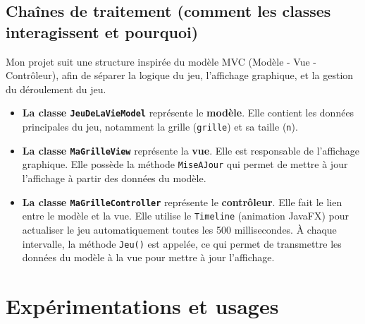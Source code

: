 \documentclass[a4paper,12pt]{article}
\begin{document}
    \subsection{Chaînes de traitement (comment les classes interagissent et pourquoi)}

Mon projet suit une structure inspirée du modèle MVC (Modèle - Vue - Contrôleur), afin de séparer la logique du jeu, l'affichage graphique, et la gestion du déroulement du jeu.

\begin{itemize}
    \item \textbf{La classe \texttt{JeuDeLaVieModel}} représente le \textbf{modèle}. Elle contient les données principales du jeu, notamment la grille (\texttt{grille}) et sa taille (\texttt{n}).
    
    \item \textbf{La classe \texttt{MaGrilleView}} représente la \textbf{vue}. Elle est responsable de l’affichage graphique. Elle possède la méthode \texttt{MiseAJour} qui permet de mettre à jour l'affichage à partir des données du modèle.
    
    \item \textbf{La classe \texttt{MaGrilleController}} représente le \textbf{contrôleur}. Elle fait le lien entre le modèle et la vue. Elle utilise le \texttt{Timeline} (animation JavaFX) pour actualiser le jeu automatiquement toutes les 500 millisecondes. À chaque intervalle, la méthode \texttt{Jeu()} est appelée, ce qui permet de transmettre les données du modèle à la vue pour mettre à jour l’affichage.
\end{itemize}
    \section{Expérimentations et usages}
\end{document}
